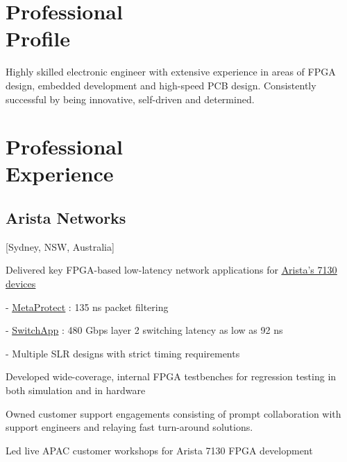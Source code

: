 \documentclass{mycv}
\begin{document}
\newcommand{\SubItem}[1]{
    {\setlength\itemindent{15pt} \item[-] #1}
}

\maketitle%

\section{Professional \\ Profile}

Highly skilled electronic engineer with extensive experience in areas of FPGA design, embedded development and high-speed PCB design. 
Consistently successful by being innovative, self-driven and determined.

\section{Professional \\ Experience}

\subsection{Arista Networks}[Sydney, NSW, Australia]
\begin{positions}
\end{positions}

\begin{itemize}[noitemsep]
  \item Delivered key FPGA-based low-latency network applications for \href{https://www.arista.com/en/products/7130-network-applications-quick-look}{\underline{Arista's 7130 devices}}
    \SubItem{\href{https://www.arista.com/assets/data/pdf/ProductBrief-MetaProtect-Firewall.pdf}{\underline{MetaProtect}} : 135 ns packet filtering}
    \SubItem{\href{https://www.arista.com/assets/data/pdf/ProductBrief-SwitchApp.pdf}{\underline{SwitchApp}} : 480 Gbps layer 2 switching latency as low as 92 ns}
    \SubItem{Multiple SLR designs with strict timing requirements}
  \item Developed wide-coverage, internal FPGA testbenches for regression testing in both simulation and in hardware
  \item Owned customer support engagements consisting of prompt collaboration with support engineers and relaying fast turn-around solutions.
  \item Led live APAC customer workshops for Arista 7130 FPGA development
\end{itemize}
\end{document}
